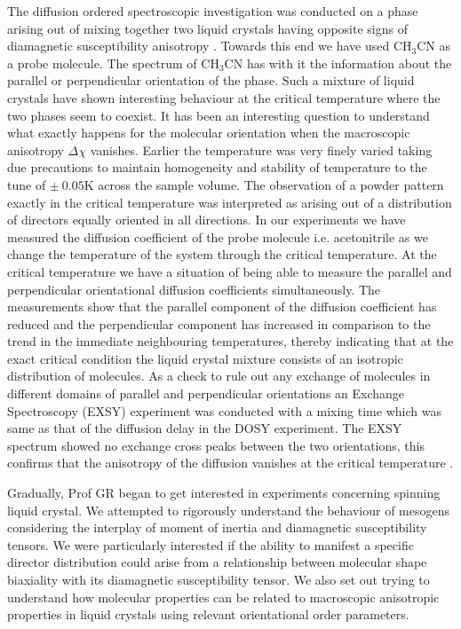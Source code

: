 The diffusion ordered spectroscopic investigation was conducted on a phase
arising out of mixing together two liquid crystals having opposite signs of
diamagnetic susceptibility anisotropy \cite{chap22-key15}. Towards this end we have used
CH$_3$CN as a probe molecule. The spectrum of CH$_3$CN has with it the information
about the parallel or perpendicular orientation of the phase. Such a mixture of
liquid crystals have shown interesting behaviour at the critical temperature where
the two phases seem to coexist. It has been an interesting question to understand
what exactly happens for the molecular orientation when the macroscopic
anisotropy $\Delta \chi$ vanishes. Earlier the temperature was very finely varied taking due
precautions to maintain homogeneity and stability of temperature to the tune of
$\pm~ 0.05$K across the sample volume. The observation of a powder pattern exactly
in the critical temperature was interpreted as arising out of a distribution of
directors equally oriented in all directions. In our experiments we have measured
the diffusion coefficient of the probe molecule i.e. acetonitrile as we change the
temperature of the system through the critical temperature. At the critical
temperature we have a situation of being able to measure the parallel and
perpendicular orientational diffusion coefficients simultaneously. The
measurements show that the parallel component of the diffusion coefficient has
reduced and the perpendicular component has increased in comparison to the
trend in the immediate neighbouring temperatures, thereby indicating that at the
exact critical condition the liquid crystal mixture consists of an isotropic
distribution of molecules. As a check to rule out any exchange of molecules in
different domains of parallel and perpendicular orientations an Exchange
Spectroscopy (EXSY) experiment was conducted with a mixing time which was
same as that of the diffusion delay in the DOSY experiment. The EXSY spectrum
showed no exchange cross peaks between the two orientations, this confirms that
the anisotropy of the diffusion vanishes at the critical temperature \cite{chap22-key16}.

Gradually, Prof GR began to get interested in experiments concerning spinning
liquid crystal. We attempted to rigorously understand the behaviour of mesogens
considering the interplay of moment of inertia and diamagnetic susceptibility
tensors. We were particularly interested if the ability to manifest a specific
director distribution could arise from a relationship between molecular shape
biaxiality with its diamagnetic susceptibility tensor. We also set out trying to
understand how molecular properties can be related to macroscopic anisotropic
properties in liquid crystals using relevant orientational order parameters.


